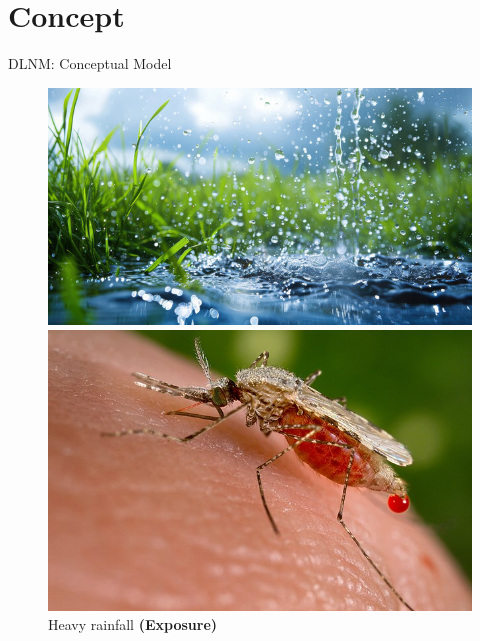 \documentclass[english]{beamer}
\newcommand{\alertblue}[1]{{\color{blue}#1}}
\begin{document}
\section{Concept}
\begin{frame}{DLNM: Conceptual Model}
\begin{figure}
    \centering
    \begin{minipage}{0.2\linewidth}
        \includegraphics[width=\linewidth]{images/rainfall.jpg}
        \caption{\footnotesize Heavy rainfall \textbf{(Exposure)}}
    \end{minipage}
    \hspace{0.5cm}
    \hspace{0.5cm}
    \begin{minipage}{0.2\linewidth}
        \centering
        \includegraphics[width=\linewidth]{images/malaria.jpeg}

\end{minipage}
\end{figure}
\end{frame}
\end{document}
